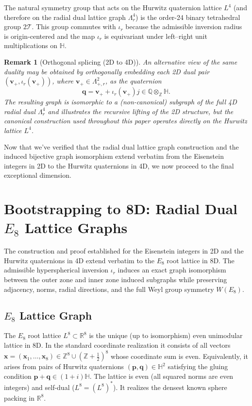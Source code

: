\documentclass{article}
\newtheorem{remark}{Remark}
\begin{document}
The natural symmetry group that acts on the Hurwitz quaternion lattice \(L^4\) (and therefore on the radial dual lattice graph \(\Lambda_r^4\)) is the order-24 binary tetrahedral group \(2\mathcal{T}\). This group commutes with \(\iota_r\) because the admissible inversion radius is origin-centered and the map \(\iota_r\) is equivariant under left--right unit multiplications on \(\mathbb{H}\).

\begin{remark}[Orthogonal splicing (2D to 4D)]
\label{rem:orthogonal-splicing-2d-4d}
An alternative view of the same duality may be obtained by orthogonally embedding each 2D dual pair $(\mathbf{v}_+, \iota_r(\mathbf{v}_+))$, where $\mathbf{v}_+ \in \Lambda_{+,r}^2$, as the quaternion
\[
\mathbf{q} = \mathbf{v}_+ + \iota_r(\mathbf{v}_+) j \in \mathbb{Q} \otimes_{\mathbb{Z}} \mathbb{H}.
\]
The resulting graph is isomorphic to a (non-canonical) subgraph of the full 4D radial dual $\Lambda_r^4$ and illustrates the recursive lifting of the 2D structure, but the canonical construction used throughout this paper operates directly on the Hurwitz lattice $L^4$.
\end{remark}

Now that we've verified that the radial dual lattice graph construction and the induced bijective graph isomorphism extend verbatim from the Eisenstein integers in 2D to the Hurwitz quaternions in 4D, we now proceed to the final exceptional dimension.

\section{Bootstrapping to 8D: Radial Dual $E_8$ Lattice Graphs}
\label{sec:bootstrapping-8d}
The construction and proof established for the Eisenstein integers in 2D and the Hurwitz quaternions in 4D extend verbatim to the $E_8$ root lattice in 8D. The admissible hyperspherical inversion \(\iota_r\) induces an exact graph isomorphism between the outer zone and inner zone induced subgraphs while preserving adjacency, norms, radial directions, and the full Weyl group symmetry $W(E_8)$.

\subsection{$E_8$ Lattice Graph}
\label{subsec:8d-e8-lattice}
The $E_8$ root lattice $L^8 \subset \mathbb{R}^8$ is the unique (up to isomorphism) even unimodular lattice in 8D. In the standard coordinate realization it consists of all vectors $\mathbf{x} = (\mathbf{x}_1,\dots,\mathbf{x}_8) \in \mathbb{Z}^8 \cup (\mathbb{Z}+\tfrac{1}{2})^8$ whose coordinate sum is even. Equivalently, it arises from pairs of Hurwitz quaternions $(\mathbf{p},\mathbf{q}) \in \mathbb{H}^2$ satisfying the gluing condition $\mathbf{p}+\mathbf{q} \in (1+i)\mathbb{H}$. The lattice is even (all squared norms are even integers) and self-dual ($L^8 = (L^8)^*$). It realizes the densest known sphere packing in $\mathbb{R}^8$.
\end{document}
